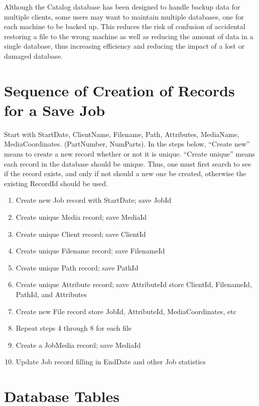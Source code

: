 {{{Although the Catalog database has been designed to handle backup data for
multiple clients, some users may want to maintain multiple databases, one for
each machine to be backed up. This reduces the risk of confusion of accidental
restoring a file to the wrong machine as well as reducing the amount of data
in a single database, thus increasing efficiency and reducing the impact of a
lost or damaged database. 

\section{Sequence of Creation of Records for a Save Job}

Start with StartDate, ClientName, Filename, Path, Attributes, MediaName,
MediaCoordinates. (PartNumber, NumParts). In the steps below, ``Create new''
means to create a new record whether or not it is unique. ``Create unique''
means each record in the database should be unique. Thus, one must first
search to see if the record exists, and only if not should a new one be
created, otherwise the existing RecordId should be used. 

\begin{enumerate}
\item Create new Job record with StartDate; save JobId  
\item Create unique Media record; save MediaId  
\item Create unique Client record; save ClientId  
\item Create unique Filename record; save FilenameId  
\item Create unique Path record; save PathId  
\item Create unique Attribute record; save AttributeId  
   store ClientId, FilenameId, PathId, and Attributes  
\item Create new File record  
   store JobId, AttributeId, MediaCoordinates, etc  
\item Repeat steps 4 through 8 for each file  
\item Create a JobMedia record; save MediaId  
\item Update Job record filling in EndDate and other Job statistics 
   \end{enumerate}

\section{Database Tables}

}}}
